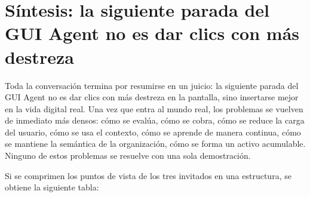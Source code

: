 \documentclass[a4paper]{article}
\begin{document}
\section{Síntesis: la siguiente parada del GUI Agent no es dar clics con más destreza}

Toda la conversación termina por resumirse en un juicio: la siguiente parada del GUI Agent no es dar clics con más destreza en la pantalla, sino insertarse mejor en la vida digital real. Una vez que entra al mundo real, los problemas se vuelven de inmediato más densos: cómo se evalúa, cómo se cobra, cómo se reduce la carga del usuario, cómo se usa el contexto, cómo se aprende de manera continua, cómo se mantiene la semántica de la organización, cómo se forma un activo acumulable. Ninguno de estos problemas se resuelve con una sola demostración.

Si se comprimen los puntos de vista de los tres invitados en una estructura, se obtiene la siguiente tabla:
\end{document}
